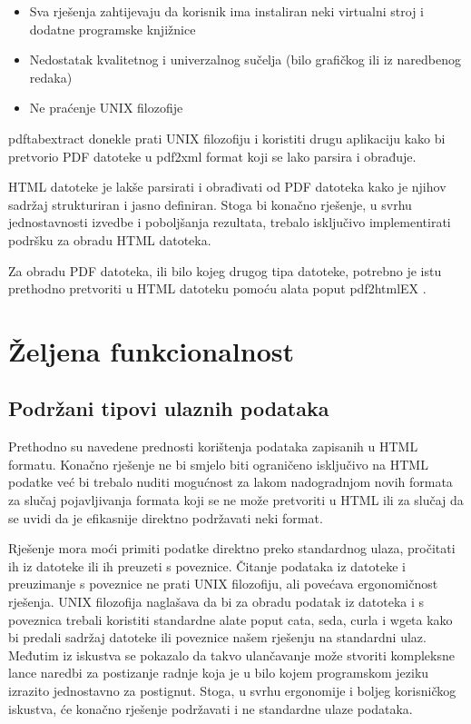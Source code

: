 \documentclass[times, utf8, zavrsni]{fer}
\begin{document}
\begin{itemize}
  \item Sva rješenja zahtijevaju da korisnik ima instaliran neki virtualni
    stroj i dodatne  programske knjižnice
  \item Nedostatak kvalitetnog i univerzalnog sučelja (bilo grafičkog ili iz
    naredbenog redaka)
  \item Ne praćenje UNIX filozofije \cite{unix_philosophy}
\end{itemize}

pdftabextract donekle prati UNIX filozofiju i koristiti drugu aplikaciju kako bi
pretvorio PDF datoteke u pdf2xml format koji se lako parsira i obrađuje.

HTML datoteke je lakše parsirati i obrađivati od PDF datoteka kako je njihov
sadržaj strukturiran i jasno definiran.
Stoga bi konačno rješenje, u svrhu
jednostavnosti izvedbe i poboljšanja rezultata, trebalo isključivo
implementirati podršku za obradu HTML datoteka.

Za obradu PDF datoteka, ili bilo kojeg drugog tipa datoteke,
potrebno je istu prethodno pretvoriti u HTML datoteku pomoću alata poput
pdf2htmlEX \cite{pdf2htmlex_repository}.

\section{Željena funkcionalnost}

\subsection{Podržani tipovi ulaznih podataka}

Prethodno su navedene prednosti korištenja podataka zapisanih u HTML formatu.
Konačno rješenje ne bi smjelo biti ograničeno isključivo na HTML podatke već
bi trebalo nuditi mogućnost za lakom nadogradnjom novih formata za slučaj
pojavljivanja formata koji se ne može pretvoriti u HTML ili za slučaj da se
uvidi da je efikasnije direktno podržavati neki format.

Rješenje mora moći primiti podatke direktno preko standardnog ulaza, pročitati
ih iz datoteke ili ih preuzeti s poveznice. Čitanje podataka iz datoteke i
preuzimanje s poveznice ne prati UNIX filozofiju, ali povećava ergonomičnost
rješenja. UNIX filozofija naglašava da bi za obradu podatak iz datoteka i s
poveznica trebali koristiti standardne alate poput cata, seda, curla i wgeta
kako bi predali sadržaj datoteke ili poveznice našem rješenju na standardni
ulaz. Međutim iz iskustva se pokazalo da takvo ulančavanje može stvoriti
kompleksne lance naredbi za postizanje radnje koja je u bilo kojem programskom
jeziku izrazito jednostavno za postignut. Stoga, u svrhu ergonomije i boljeg
korisničkog iskustva, će konačno rješenje podržavati i ne standardne ulaze
podataka.
\end{document}
